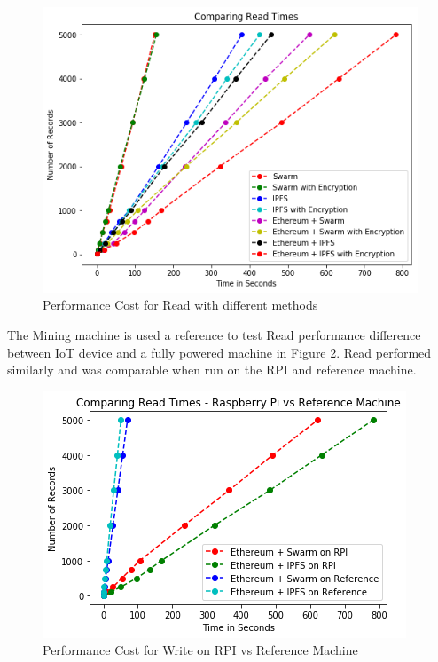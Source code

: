 \documentclass[11pt,openright]{report}
\begin{document}
\begin{figure}[!htbp]
    \centering
    \includegraphics[scale=0.8]{results/graphs/ReadComp.png}
    \caption{Performance Cost for Read with different methods}
    \label{fig:graph_perf_cost_read}
\end{figure}

The Mining machine is used a reference to test Read performance difference between IoT device and a fully powered machine in Figure \ref{fig:graph_perf_cost_read_pi_ref}. Read performed similarly and was comparable when run on the RPI and reference machine.
\newline
\newline
\begin{figure}[!htbp]
    \centering
    \includegraphics[scale=1]{results/graphs/ReadComp_Pi_v_Ref.png}
    \caption{Performance Cost for Write on RPI vs Reference Machine}
    \label{fig:graph_perf_cost_read_pi_ref}
\end{figure}
\newline
\newline
\end{document}
